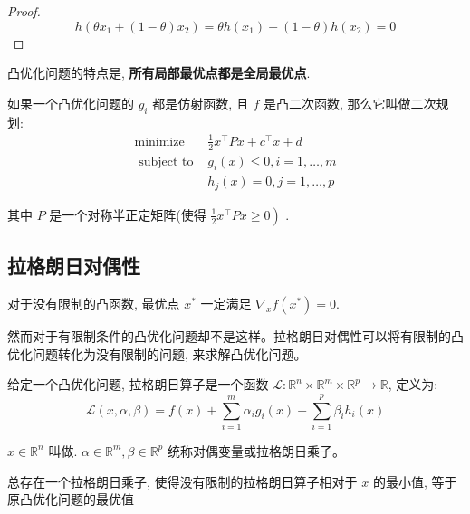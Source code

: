 \begin{proof}
    $$ h\left(\theta x_{1}+(1-\theta) x_{2}\right)=\theta h\left(x_{1}\right)+(1-\theta) h\left(x_{2}\right)=0 $$
\end{proof}

凸优化问题的特点是, \textbf{所有局部最优点都是全局最优点}.

\begin{definition}[二次规划]
    如果一个凸优化问题的 $ g_{i} $ 都是仿射函数, 且 $ f $ 是凸二次函数, 那么它叫做二次规划:
    $$
    \begin{array}{ll}
    \operatorname{minimize} & \frac{1}{2} x^{\top} P x+c^{\top} x+d \\
    \text { subject to } & g_{i}(x) \leqslant 0, i=1, \ldots, m \\
    & h_{j}(x)=0, j=1, \ldots, p
    \end{array}
    $$

    其中 $ P $ 是一个对称半正定矩阵(使得 $ \left.\frac{1}{2} x^{\top} P x \geqslant 0\right) $ .
\end{definition}



\subsection{拉格朗日对偶性}

\begin{theorem}
    对于没有限制的凸函数, 最优点 $ x^{*} $ 一定满足 $ \nabla_{x} f\left(x^{*}\right)=0 $.
\end{theorem}

然而对于有限制条件的凸优化问题却不是这样。拉格朗日对偶性可以将有限制的凸优化问题转化为没有限制的问题, 来求解凸优化问题。

\begin{definition}[拉格朗日函数]
    给定一个凸优化问题, 拉格朗日算子是一个函数 $ \mathcal{L}: \mathbb{R}^{n} \times \mathbb{R}^{m} \times \mathbb{R}^{p} \rightarrow \mathbb{R} $, 定义为:
    $$
    \mathcal{L}(x, \alpha, \beta)=f(x)+\sum_{i=1}^{m} \alpha_{i} g_{i}(x)+\sum_{i=1}^{p} \beta_{i} h_{i}(x)
    $$

    $ x \in \mathbb{R}^{n} $ 叫做. $ \alpha \in \mathbb{R}^{m}, \beta \in \mathbb{R}^{p} $ 统称对偶变量或拉格朗日乘子。
\end{definition}

\begin{theorem}
    总存在一个拉格朗日乘子, 使得没有限制的拉格朗日算子相对于 $ x $ 的最小值, 等于原凸优化问题的最优值
\end{theorem}

